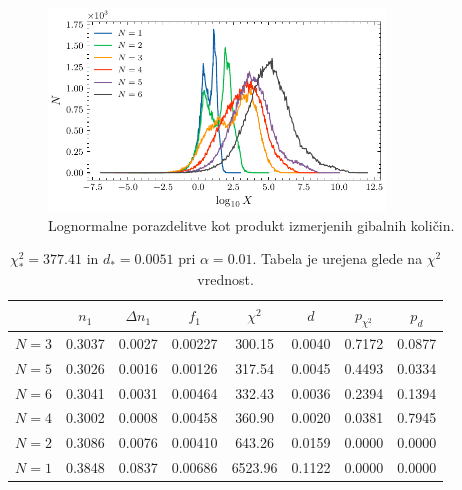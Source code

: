 \documentclass[11pt, oneside]{article}
\theoremstyle{definition}
\begin{document}
\newpage

\begin{figure}[h!]
    \centering
    \includegraphics[width=0.8\textwidth]{dielectron_lognorm.pdf}
    \caption{Lognormalne porazdelitve kot produkt izmerjenih gibalnih količin.}
    \label{fig: di_electron_lognorm}
\end{figure}

\begin{table}[h!]
    \begin{center}
        \hspace*{-0.8cm}
        \begin{tabular}{cccccccc}
            \toprule
            {}    & $n_1$  & $\Delta n_1$ & $f_1$   & $\chi^2$ & $d$    & $p_{\chi^2}$ & $p_d$  \\
            \midrule
            $N=3$ & 0.3037 & 0.0027       & 0.00227 & 300.15   & 0.0040 & 0.7172       & 0.0877 \\
            $N=5$ & 0.3026 & 0.0016       & 0.00126 & 317.54   & 0.0045 & 0.4493       & 0.0334 \\
            $N=6$ & 0.3041 & 0.0031       & 0.00464 & 332.43   & 0.0036 & 0.2394       & 0.1394 \\
            $N=4$ & 0.3002 & 0.0008       & 0.00458 & 360.90   & 0.0020 & 0.0381       & 0.7945 \\
            $N=2$ & 0.3086 & 0.0076       & 0.00410 & 643.26   & 0.0159 & 0.0000       & 0.0000 \\
            $N=1$ & 0.3848 & 0.0837       & 0.00686 & 6523.96  & 0.1122 & 0.0000       & 0.0000 \\
            \bottomrule
        \end{tabular}
    \end{center}
    \caption{$\chi^2_*=377.41$ in $d_*=0.0051$ pri $\alpha=0.01$. Tabela je urejena glede na $\chi^2$ vrednost.}
    \label{tab: 5}
\end{table}
\end{document}

